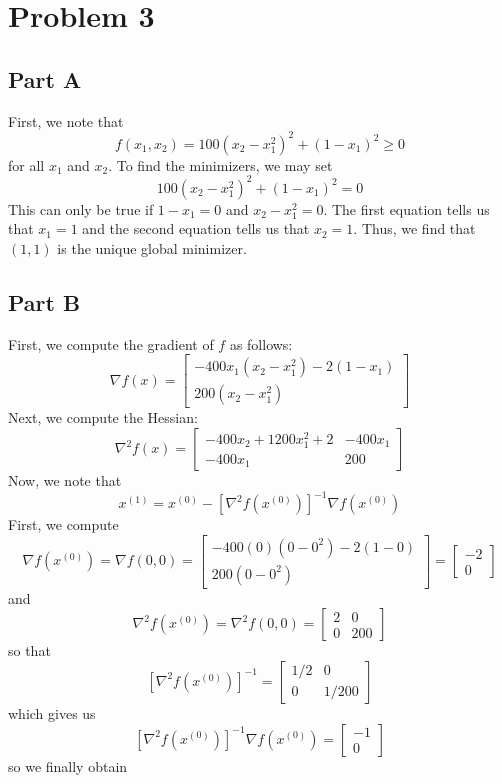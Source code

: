 \documentclass[12pt]{article}
\begin{document}
\newpage
\section*{Problem 3}
\subsection*{Part A}
First, we note that
\[
f(x_1,x_2) = 100(x_2-x_1^2)^2 + (1-x_1)^2 \geq 0
\] for all $x_1$ and $x_2$. To find the minimizers, we may set
\[
100(x_2-x_1^2)^2 + (1-x_1)^2 = 0
\] This can only be true if $1-x_1 = 0$ and $x_2 - x_1^2 = 0$. The first equation tells us that $x_1 = 1$ and the second equation tells us that $x_2 = 1$. Thus, we find that $(1,1)$ is the unique global minimizer.
\newpage
\subsection*{Part B}
First, we compute the gradient of $f$ as follows:
\[
\nabla f(x) =
\begin{bmatrix}
 -400 x_1 (x_2 - x_1^2) - 2(1-x_1)\\
 200(x_2 - x_1^2)
\end{bmatrix}
\] Next, we compute the Hessian:
\[
\nabla^2 f(x) = 
\begin{bmatrix}
-400 x_2 + 1200 x_1^2 + 2 & -400x_1\\
-400x_1 & 200
\end{bmatrix}
\] Now, we note that
\[
x^{(1)} = x^{(0)} - [\nabla^2 f(x^{(0)})]^{-1} \nabla f(x^{(0)}) 
\] First, we compute 
\[
 \nabla f(x^{(0)})  = \nabla f(0,0) = \begin{bmatrix}
 -400 (0) (0 - 0^2) - 2(1-0)\\
 200(0 - 0^2)
\end{bmatrix}
= \begin{bmatrix}
-2\\
0
\end{bmatrix}
\] and 
\[
\nabla^2 f(x^{(0)}) = \nabla^2 f(0,0) = \begin{bmatrix}
2 & 0\\
0 & 200
\end{bmatrix}
\] so that
\[
[\nabla^2 f(x^{(0)})]^{-1} = \begin{bmatrix}
1/2 & 0\\
0 & 1/200
\end{bmatrix}
\] which gives us 
\[
[\nabla^2 f(x^{(0)})]^{-1} \nabla f(x^{(0)})  = \begin{bmatrix} -1 \\ 0
\end{bmatrix}
\] so we finally obtain
\end{document}
